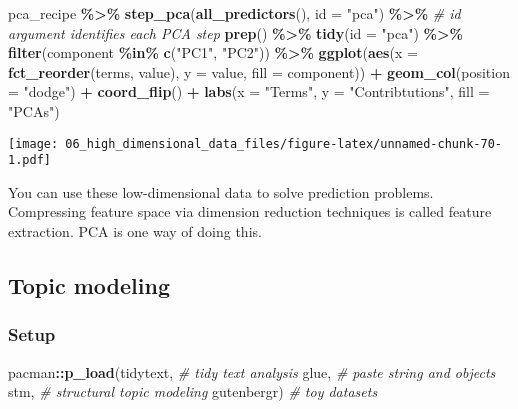 \documentclass[
]{book}
\newenvironment{Shaded}{\begin{snugshade}}{\end{snugshade}}
\newcommand{\CommentTok}[1]{\textcolor[rgb]{0.56,0.35,0.01}{\textit{#1}}}
\newcommand{\DataTypeTok}[1]{\textcolor[rgb]{0.13,0.29,0.53}{#1}}
\newcommand{\KeywordTok}[1]{\textcolor[rgb]{0.13,0.29,0.53}{\textbf{#1}}}
\newcommand{\NormalTok}[1]{#1}
\newcommand{\OperatorTok}[1]{\textcolor[rgb]{0.81,0.36,0.00}{\textbf{#1}}}
\newcommand{\StringTok}[1]{\textcolor[rgb]{0.31,0.60,0.02}{#1}}
\begin{document}
\begin{Shaded}
\begin{Highlighting}[]
\NormalTok{pca\_recipe }\OperatorTok{\%\textgreater{}\%}
\StringTok{  }\KeywordTok{step\_pca}\NormalTok{(}\KeywordTok{all\_predictors}\NormalTok{(), }
           \DataTypeTok{id =} \StringTok{"pca"}\NormalTok{) }\OperatorTok{\%\textgreater{}\%}\StringTok{ }\CommentTok{\# id argument identifies each PCA step }
\StringTok{  }\KeywordTok{prep}\NormalTok{() }\OperatorTok{\%\textgreater{}\%}
\StringTok{  }\KeywordTok{tidy}\NormalTok{(}\DataTypeTok{id =} \StringTok{"pca"}\NormalTok{) }\OperatorTok{\%\textgreater{}\%}
\StringTok{  }\KeywordTok{filter}\NormalTok{(component }\OperatorTok{\%in\%}\StringTok{ }\KeywordTok{c}\NormalTok{(}\StringTok{"PC1"}\NormalTok{, }\StringTok{"PC2"}\NormalTok{)) }\OperatorTok{\%\textgreater{}\%}
\StringTok{  }\KeywordTok{ggplot}\NormalTok{(}\KeywordTok{aes}\NormalTok{(}\DataTypeTok{x =} \KeywordTok{fct\_reorder}\NormalTok{(terms, value), }\DataTypeTok{y =}\NormalTok{ value, }
             \DataTypeTok{fill =}\NormalTok{ component)) }\OperatorTok{+}
\StringTok{    }\KeywordTok{geom\_col}\NormalTok{(}\DataTypeTok{position =} \StringTok{"dodge"}\NormalTok{) }\OperatorTok{+}
\StringTok{    }\KeywordTok{coord\_flip}\NormalTok{() }\OperatorTok{+}
\StringTok{    }\KeywordTok{labs}\NormalTok{(}\DataTypeTok{x =} \StringTok{"Terms"}\NormalTok{,}
         \DataTypeTok{y =} \StringTok{"Contribtutions"}\NormalTok{,}
         \DataTypeTok{fill =} \StringTok{"PCAs"}\NormalTok{) }
\end{Highlighting}
\end{Shaded}

\texttt{[image: 06\_high\_dimensional\_data\_files/figure-latex/unnamed-chunk-70-1.pdf]}

You can use these low-dimensional data to solve prediction problems. Compressing feature space via dimension reduction techniques is called feature extraction. PCA is one way of doing this.

\hypertarget{topic-modeling}{%
\subsection{Topic modeling}\label{topic-modeling}}

\hypertarget{setup-3}{%
\subsubsection{Setup}\label{setup-3}}

\begin{Shaded}
\begin{Highlighting}[]
\NormalTok{pacman}\OperatorTok{::}\KeywordTok{p\_load}\NormalTok{(tidytext, }\CommentTok{\# tidy text analysis}
\NormalTok{               glue, }\CommentTok{\# paste string and objects                }
\NormalTok{               stm, }\CommentTok{\# structural topic modeling}
\NormalTok{               gutenbergr) }\CommentTok{\# toy datasets }
\end{Highlighting}
\end{Shaded}
\end{document}
